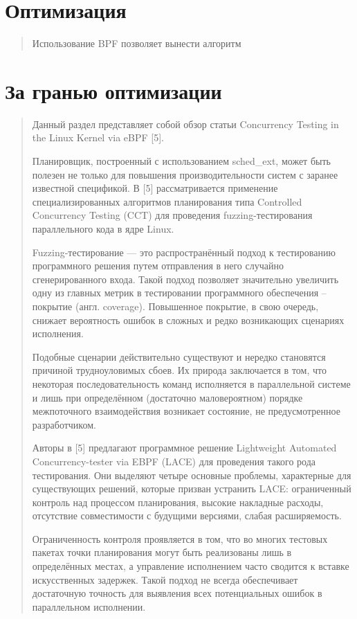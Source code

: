 \documentclass[12pt, oneside]{book}
\begin{document}
\section{Оптимизация}
\begin{quote}
  Использование BPF позволяет вынести алгоритм 
\end{quote}

\section{За гранью оптимизации}
\begin{quote}
  Данный раздел представляет собой обзор статьи 
  Concurrency Testing in the Linux Kernel via eBPF [5].
 

  Планировщик, построенный с использованием sched\_ext, может быть
  полезен не только для повышения производительности систем с заранее
  известной спецификой. В [5] рассматривается применение специализированных
  алгоритмов планирования типа Controlled Concurrency Testing (CCT)
  для проведения fuzzing-тестирования параллельного кода в ядре Linux.

  Fuzzing-тестирование --- это распространённый подход к тестированию
  программного решения путем отправления в него случайно сгенерированного входа.
  Такой подход позволяет значительно увеличить одну из главных метрик
  в тестировании программного обеспечения -- покрытие (англ. coverage).
  Повышенное покрытие, в свою очередь, снижает вероятность ошибок в сложных
  и редко возникающих сценариях исполнения.

  Подобные сценарии действительно существуют и нередко становятся причиной
  трудноуловимых сбоев. Их природа заключается в том, что некоторая
  последовательность команд исполняется в параллельной системе и лишь
  при определённом (достаточно маловероятном) порядке межпоточного
  взаимодействия возникает состояние, не предусмотренное разработчиком.

  Авторы в [5] предлагают программное решение Lightweight Automated \\
  Concurrency-tester via EBPF (LACE) для проведения такого рода
  тестирования. Они выделяют четыре основные проблемы,
  характерные для существующих решений, которые призван устранить LACE:
  ограниченный контроль над процессом планирования,
  высокие накладные расходы,
  отсутствие совместимости с будущими версиями,
  слабая расширяемость.

  Ограниченность контроля проявляется в том, что во многих
  тестовых пакетах точки планирования могут быть реализованы лишь в
  определённых местах, а управление исполнением часто сводится
  к вставке искусственных задержек.
  Такой подход не всегда обеспечивает достаточную
  точность для выявления всех потенциальных ошибок в параллельном
  исполнении.


\end{quote}
\end{document}
